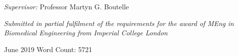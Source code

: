 \begin{titlepage}
\begin{center}
\large
\textit{Supervisor:}
Professor Martyn G. Boutelle


\vspace{5cm}
\small
\textit{Submitted in partial fulfilment of the requirements for the award of MEng in Biomedical Engineering from Imperial College London}

\end{center}

\vspace{2.5cm}
June 2019   \hfill  Word Count: 5721

\vfill %



\makeatother


\end{titlepage}